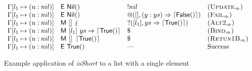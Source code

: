 \begin{figure*}
\[\begin{array}{llll}
            \Gamma[l_1\mapsto(u : nil)]             & \eval{\nil}                                                & !nil                                     & (\smallrule{Update})   \\
            \Gamma[l_1\mapsto(u : nil)]             & \eval{\nil}                                                & @([],\matchpat{(y : ys)}{\retFalse})     & (\smallrule{Fail})     \\
            \Gamma[l_1\mapsto(u : nil)]             & \match{[]}{\matchfail}                                     & ?([l_1],\matchpat{ys}{\retTrue})         & (\smallrule{Alt2})     \\
            \Gamma[l_1\mapsto(u : nil)]             & \match{[l_1]}{\matchpat{ys}{\retTrue}}                     & \$                                       & (\smallrule{Bind})     \\
            \Gamma[l_1\mapsto(u : nil)]             & \match{[]}{\retTrue}                                       & \$                                       & (\smallrule{Retun1B})  \\
            \Gamma[l_1\mapsto(u : nil)]             & \eval{\true}                                               & \text{---}                               & \text{Success}         \\
        \end{array}
    \]
    \caption{Example application of \textit{isShort} to a list with a single element}\label{ex:isShort}
\end{figure*}